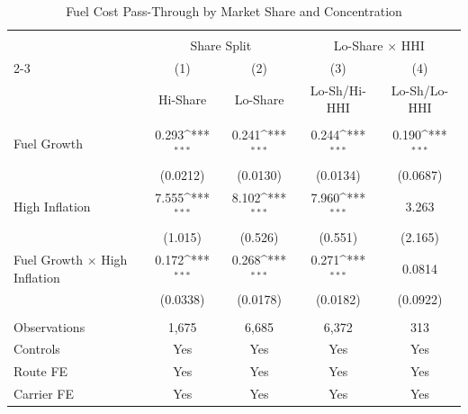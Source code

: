 \begin{table}[p]
\centering
\caption{Fuel Cost Pass-Through by Market Share and Concentration}
\label{tab:dominance\_concentration}
\scriptsize
\setlength{\tabcolsep}{2pt}
\renewcommand{\arraystretch}{0.9}
\def\sym#1{\ifmmode^{#1}\else\(^{#1}\)\fi}
\begin{tabular}{l*{4}{c}}
\\[-1.8ex]\hline
\hline \\[-1.8ex]
                    &\multicolumn{2}{c}{Share Split}            &\multicolumn{2}{c}{Lo-Share $\times$ HHI}  \\\cline{2-3}\cline{4-5}
                    &\multicolumn{1}{c}{(1)}&\multicolumn{1}{c}{(2)}&\multicolumn{1}{c}{(3)}&\multicolumn{1}{c}{(4)}\\
                    &\multicolumn{1}{c}{Hi-Share}&\multicolumn{1}{c}{Lo-Share}&\multicolumn{1}{c}{Lo-Sh/Hi-HHI}&\multicolumn{1}{c}{Lo-Sh/Lo-HHI}\\
\hline \\[-1.8ex]
Fuel Growth         &       0.293\sym{***}&       0.241\sym{***}&       0.244\sym{***}&       0.190\sym{***}\\
                    &    (0.0212)         &    (0.0130)         &    (0.0134)         &    (0.0687)         \\
High Inflation      &       7.555\sym{***}&       8.102\sym{***}&       7.960\sym{***}&       3.263         \\
                    &     (1.015)         &     (0.526)         &     (0.551)         &     (2.165)         \\
Fuel Growth $\times$ High Inflation&       0.172\sym{***}&       0.268\sym{***}&       0.271\sym{***}&      0.0814         \\
                    &    (0.0338)         &    (0.0178)         &    (0.0182)         &    (0.0922)         \\
\hline \\[-1.8ex]
Observations        &       1,675         &       6,685         &       6,372         &         313         \\
Controls            &         Yes         &         Yes         &         Yes         &         Yes         \\
Route FE            &         Yes         &         Yes         &         Yes         &         Yes         \\
Carrier FE          &         Yes         &         Yes         &         Yes         &         Yes         \\

\end{tabular}
\end{table}
